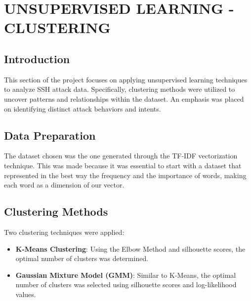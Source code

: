 

\section{UNSUPERVISED LEARNING - CLUSTERING}


    \subsection{Introduction}
    
        This section of the project focuses on applying unsupervised learning techniques to analyze SSH attack data. Specifically, clustering methods were utilized to uncover patterns and relationships within the dataset. An emphasis was placed on identifying distinct attack behaviors and intents.

    \subsection{Data Preparation}
    
        The dataset chosen was the one generated through the TF-IDF vectorization technique. This was made because it was essential to start with a dataset that represented in the best way the frequency and the importance of words, making each word as a dimension of our vector.

    \subsection{Clustering Methods}
    
        Two clustering techniques were applied:
        
        \begin{itemize}
        
            \item \textbf{K-Means Clustering}: Using the Elbow Method and silhouette scores, the optimal number of clusters was determined.
            
            \item \textbf{Gaussian Mixture Model (GMM)}: Similar to K-Means, the optimal number of clusters was selected using silhouette scores and log-likelihood values.
            
        \end{itemize}

